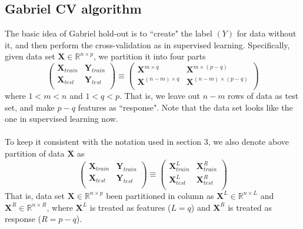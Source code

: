\documentclass[11pt]{article}
\begin{document}
\subsection*{Gabriel CV algorithm}
The basic idea of Gabriel hold-out is to ``create" the label $(Y)$ for data without it, and then perform the cross-validation as in supervised learning. Specifically, given data set 
$\mathbf{X} \in \mathbb{R}^{n \times p}$, we partition it into four parts
\[
\begin{pmatrix}
  \mathbf{X}_{train} & \mathbf{Y}_{train}\\
  \mathbf{X}_{test}  & \mathbf{Y}_{test}\\
  \end{pmatrix} \equiv 
  \begin{pmatrix}
  \mathbf{X}^{m \times q } & \mathbf{X}^{m \times (p-q)}\\
  \mathbf{X}^{(n-m) \times q}  & \mathbf{X}^{(n-m) \times (p-q)}\\
  \end{pmatrix}
 \]
  where $ 1 < m < n$ and $1<q<p$. That is, we leave out $n-m$ rows of data as test set, and make $p-q$ features as ``response". Note that the data set looks like the one in supervised learning now.\\\\
To keep it consistent with the notation used in section $3$, we also denote above partition of data $\mathbf{X}$ as 
\[
\begin{pmatrix}
  \mathbf{X}_{train} & \mathbf{Y}_{train}\\
  \mathbf{X}_{test}  & \mathbf{Y}_{test}\\
  \end{pmatrix} \equiv 
  \begin{pmatrix}
\mathbf{X}^L_{train} & \mathbf{X}^R_{train}\\
  \mathbf{X}^L_{test}  & \mathbf{X}^R_{test}\\
  \end{pmatrix}
 \]
That is, data set $\mathbf{X} \in \mathbb{R}^{n \times p}$ been partitioned in column as $\mathbf{X}^L \in \mathbb{R}^{n \times L}$ and $\mathbf{X}^R \in \mathbb{R}^{n \times R}$, where $\mathbf{X}^L$ is treated as features ($L=q$) and $\mathbf{X}^R$ is treated as response ($R=p-q$).\\
\end{document}
